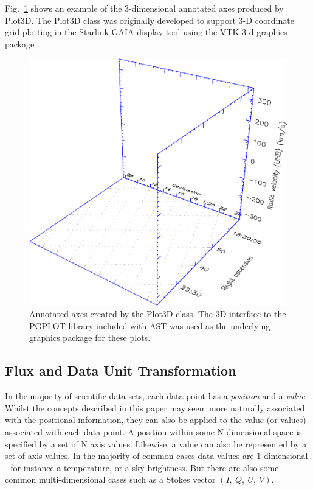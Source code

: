 \documentclass[final,authoryear,5p,times,twocolumn]{elsarticle}
\begin{document}
Fig.~\ref{fig:3dplot} shows an example of the 3-dimensional annotated axes
produced by Plot3D. The Plot3D class was originally developed to
support 3-D coordinate grid plotting in the Starlink GAIA display tool
\citep[][]{2008ASPC..394..339D} using the VTK 3-d graphics
package \citep{Hanwell2015}.

\begin{figure}[h]
\centering
\includegraphics[width=\columnwidth]{3dplot}
\caption{Annotated axes created by the Plot3D class. The 3D interface to the
PGPLOT library included with AST was used as the underlying graphics package
for these plots.}
\label{fig:3dplot}
\end{figure}


\subsection{Flux and Data Unit Transformation}

In the majority of scientific data sets, each data point has a
\emph{position} and a \emph{value}. Whilst the concepts described in this
paper may seem more naturally associated with the positional information,
they can also be applied to the value (or values) associated with each
data point. A position within some N-dimensional space is specified by a
set of N axis values. Likewise, a value can also be represented by a set
of axis values. In the majority of common cases data values are
1-dimensional - for instance a temperature, or a sky brightness. But
there are also some common multi-dimensional cases such as a Stokes vector
$(I,~Q,~U,~V)$.
\end{document}
